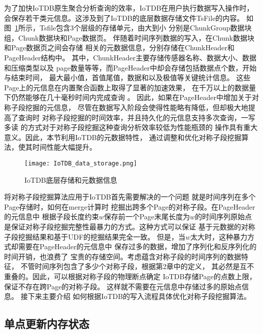 为了加快IoTDB原生聚合分析查询的效率，IoTDB在用户执行数据写入操作时，
会保存若干类元信息。这涉及到了IoTDB的底层数据存储文件TsFile的内容。
如图~\ref{fig:iotdb}所示，Tsfile包含3个层级的存储单元，由大到小
分别是ChunkGroup数据块组，Chunk数据块和Page数据页。
伴随着时间序列数据的写入，在Chunk数据块和Page数据页之间会存储
相关的元数据信息，分别存储在ChunkHeader和PageHeader结构中。
其中，ChunkHeader主要存储传感器名称、数据大小、数据和压缩类型以及
page数量等等，而PageHeader中却会存储包括数据点个数，开始与结束时间，
最大最小值，首值尾值，数据和以及极值等关键统计信息。
这些Page上的元信息在内置聚合函数上取得了显著的加速效果，
在千万以上的数据量下仍然能够在几十毫秒时间内完成查询
\cite{DBLP:conf/cikm/Huang0WZW16}。
因此，如果在PageHeader中增加关于对称子段挖掘的元信息，
尽管在数据写入阶段会使得性能略有降低，但却极大地提高了查询时
对称子段挖掘的时间效率，并且持久化的元信息支持多次查询，一写多读
的方式对于对称子段挖掘这种查询分析效率较低为性能瓶颈的
操作具有重大意义。因此，本节利用IoTDB的元数据特性，
通过调整和优化对称子段挖掘算法，使其时间性能大幅提升。
\begin{figure}
  \centering
  \texttt{[image: IoTDB\_data\_storage.png]}
  \caption{IoTDB底层存储和元数据信息}
  \label{fig:iotdb}
\end{figure}

将对称子段挖掘算法应用于IoTDB首先需要解决的一个问题
就是时间序列在多个Page存储时，如何在merge计算时
挖掘出跨多个Page的对称子段。在PageHeader的元信息中
根据子段长度约束$w$保存前一个Page末尾长度为$w$的时间序列原始点
是保证对称子段挖掘完整性最暴力的方式。这种方式可以保证
基于元数据的对称子段挖掘结果和基于UDF的挖掘结果完全一致。
但是，当$w$太大时，这种暴力方式却需要在PageHeader的元信息中
保存过多的数据，增加了序列化和反序列化的时间开销，也浪费了
宝贵的存储空间。考虑蕴含对称子段的时间序列的数据特征，
不管时间序列包含了多少个对称子段，根据第2章中的定义，
其必然是互不重叠的。因此，可以根据对称子段的物理断点确定
IoTDB存储Page的点数上限，保证不存在跨Page的对称子段。
这样就不需要在元信息中存储过多的原始点信息。
接下来主要介绍
如何根据IoTDB的写入流程具体优化对称子段挖掘算法。


\subsection{单点更新内存状态}

